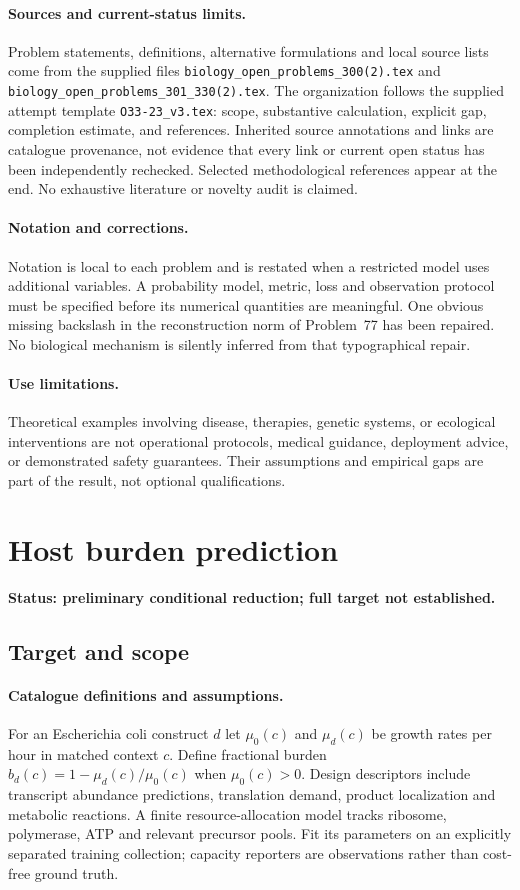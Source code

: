 \documentclass[11pt]{article}
\begin{document}
\paragraph{Sources and current-status limits.}
Problem statements, definitions, alternative formulations and local source lists
come from the supplied files
\texttt{biology\_open\_problems\_300(2).tex} and
\texttt{biology\_open\_problems\_301\_330(2).tex}.
The organization follows the supplied attempt template
\texttt{O33-23\_v3.tex}: scope, substantive calculation, explicit gap,
completion estimate, and references. Inherited source annotations and links are
catalogue provenance, not evidence that every link or current open status has
been independently rechecked. Selected methodological references appear at the
end. No exhaustive literature or novelty audit is claimed.

\paragraph{Notation and corrections.}
Notation is local to each problem and is restated when a restricted model uses
additional variables. A probability model, metric, loss and observation protocol
must be specified before its numerical quantities are meaningful. One obvious
missing backslash in the reconstruction norm of Problem~77 has been repaired.
No biological mechanism is silently inferred from that typographical repair.

\paragraph{Use limitations.}
Theoretical examples involving disease, therapies, genetic systems, or ecological
interventions are not operational protocols, medical guidance, deployment advice,
or demonstrated safety guarantees. Their assumptions and empirical gaps are part
of the result, not optional qualifications.


\section*{Host burden prediction}
\label{prob:263}
\noindent\textbf{Status: preliminary conditional reduction; full target not established.}
\subsection{Target and scope}
\paragraph{Catalogue definitions and assumptions.}
For an Escherichia coli construct $d$ let $\mu_0(c)$ and $\mu_d(c)$ be growth rates per hour in matched context $c$. Define fractional burden $b_d(c)=1-\mu_d(c)/\mu_0(c)$ when $\mu_0(c)>0$. Design descriptors include transcript abundance predictions, translation demand, product localization and metabolic reactions. A finite resource-allocation model tracks ribosome, polymerase, ATP and relevant precursor pools. Fit its parameters on an explicitly separated training collection; capacity reporters are observations rather than cost-free ground truth.
\end{document}
